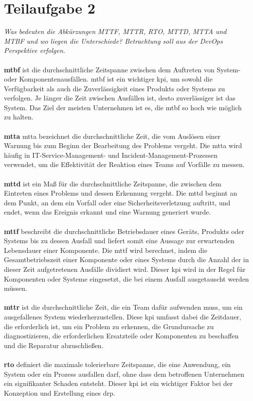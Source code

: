 \section{Teilaufgabe 2}

\textit{Was bedeuten die Abkürzungen MTTF, MTTR, RTO, MTTD, MTTA und MTBF und wo liegen die Unterschiede? Betrachtung soll aus der DevOps Perspektive erfolgen.}
\\
\\
\textbf{\ac{mtbf}} ist die durchschnittliche Zeitspanne zwischen dem Auftreten von System- oder Komponentenausfällen. \ac{mtbf} ist ein wichtiger \ac{kpi}, um sowohl die Verfügbarkeit als auch die Zuverlässigkeit eines Produkts oder Systems zu verfolgen. Je länger die Zeit zwischen Ausfällen ist, desto zuverlässiger ist das System. Das Ziel der meisten Unternehmen ist es, die \ac{mtbf} so hoch wie möglich zu halten. \cite{ref04}
\\
\\
\textbf{\ac{mtta}} \ac{mtta} bezeichnet die durchschnittliche Zeit, die vom Auslösen einer Warnung bis zum Beginn der Bearbeitung des Problems vergeht. Die \ac{mtta}  wird häufig in IT-Service-Management- und Incident-Management-Prozessen verwendet, um die Effektivität der Reaktion eines Teams auf Vorfälle zu messen. \cite{ref05}
\\
\\
\textbf{\ac{mttd}} ist ein Maß für die durchschnittliche Zeitspanne, die zwischen dem Eintreten eines Problems und dessen Erkennung vergeht. Die \ac{mttd} beginnt an dem Punkt, an dem ein Vorfall oder eine Sicherheitsverletzung auftritt, und endet, wenn das Ereignis erkannt und eine Warnung generiert wurde. \cite{ref04}
\\
\\
\textbf{\ac{mttf}} beschreibt die durchschnittliche Betriebsdauer eines Geräts, Produkts oder Systems bis zu dessen Ausfall und liefert somit eine Aussage zur erwartenden Lebensdauer einer Komponente. Die \ac{mttf} wird berechnet, indem die Gesamtbetriebszeit einer Komponente oder eines Systems durch die Anzahl der in dieser Zeit aufgetretenen Ausfälle dividiert wird. Dieser \ac{kpi} wird in der Regel für Komponenten oder Systeme eingesetzt, die bei einem Ausfall  ausgetauscht werden müssen. \cite{ref04}
\\
\\
\textbf{\ac{mttr}} ist die durchschnittliche Zeit, die ein Team dafür aufwenden muss, um ein ausgefallenes System wiederherzustellen. Diese \ac{kpi} umfasst dabei die Zeitdauer, die erforderlich ist, um ein Problem zu erkennen, die Grundursache zu diagnostizieren, die erforderlichen Ersatzteile oder Komponenten zu beschaffen und die Reparatur abzuschließen. \cite{ref06}
\\
\\
\textbf{\ac{rto}} definiert die maximale tolerierbare Zeitspanne, die eine Anwendung, ein System oder ein Prozess ausfallen darf, ohne dass dem betroffenen Unternehmen ein signifikanter Schaden entsteht. Dieser \ac{kpi} ist ein wichtiger Faktor bei der Konzeption und Erstellung eines \ac{drp}. \cite{ref07}
